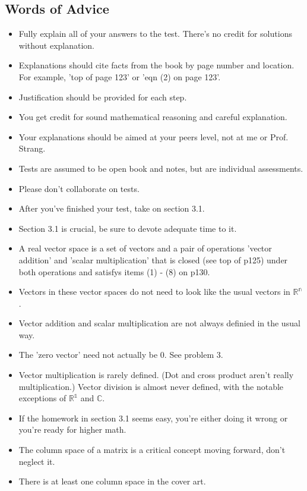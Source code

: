 	\subsection{Words of Advice}
		\begin{itemize}
			\item Fully explain all of your answers to the test. There's no credit for solutions without explanation.
			\item Explanations should cite facts from the book by page number and location. For example, 'top of page 123' or 'eqn (2) on page 123'.
			\item Justification should be provided for each step.
			\item You get credit for sound mathematical reasoning and careful explanation.
			\item Your explanations should be aimed at your peers level, not at me or Prof. Strang.
			\item Tests are assumed to be open book and notes, but are individual assessments.
			\item Please don't collaborate on tests.
			\item After you've finished your test, take on section 3.1.
			\item Section 3.1 is crucial, be sure to devote adequate time to it.
			\item A real vector space is a set of vectors and a pair of operations 'vector addition' and 'scalar multiplication' that is closed (see top of p125) under both operations and satisfys items (1) - (8) on p130.
			\item Vectors in these vector spaces do not need to look like the usual vectors in $\mathbb{R^n}$.
			\item Vector addition and scalar multiplication are not always definied in the usual way.
			\item The 'zero vector' need not actually be 0. See problem 3.
			\item Vector multiplication is rarely defined. (Dot and cross product aren't really multiplication.) Vector division is almost never defined, with the notable exceptions of $\mathbb{R^1}$ and $\mathbb{C}$.
			\item If the homework in section 3.1 seems easy, you're either doing it wrong or you're ready for higher math.
			\item The column space of a matrix is a critical concept moving forward, don't neglect it.
			\item There is at least one column space in the cover art.

\end{itemize}
